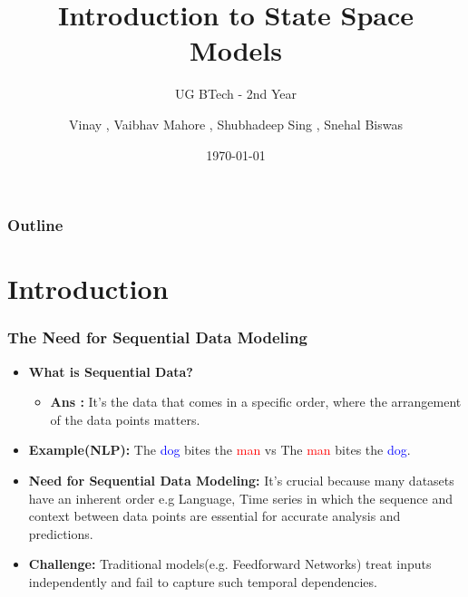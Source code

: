 \documentclass{beamer}
\title{Introduction to State Space Models}
\subtitle{UG BTech - 2nd Year}
\author{Vinay , Vaibhav Mahore , Shubhadeep Sing , Snehal Biswas}
\institute{Indian Institute of Science, Bangalore}
\date{\today}
\begin{document}
\frame{\titlepage}

\begin{frame}
\frametitle{Outline}
\tableofcontents
\end{frame}

\section{Introduction}

\begin{frame}
\frametitle{The Need for Sequential Data Modeling}
\begin{itemize}
    \item \textbf{What is Sequential Data?}   \\
    \begin{itemize}
        \item \textbf{Ans :} It's the  data that comes in a specific order, where the arrangement of the data points matters.
    \end{itemize}
    \item \textbf{Example(NLP):}  
    The \textcolor{blue}{dog} bites the \textcolor{red}{man} vs The \textcolor{red}{man} bites the \textcolor{blue}{dog}.
    \item \textbf{Need for Sequential Data Modeling:}
    It's crucial because many datasets have an inherent order e.g Language, Time series in which the sequence and context between data points are essential for accurate analysis and predictions.
    \item \textbf{Challenge:}  
    Traditional models(e.g. Feedforward Networks) treat inputs independently and fail to capture such temporal dependencies.
\end{itemize}
\end{frame}
\end{document}
